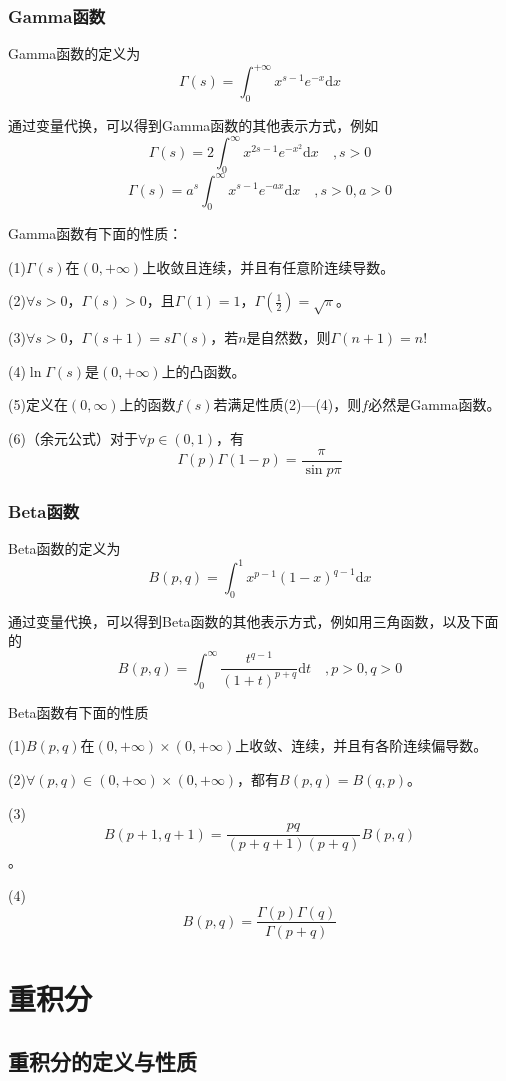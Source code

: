 \documentclass[UTF8,openany]{book}
\begin{document}
	\subsection{Gamma函数}
	\par Gamma函数的定义为
	\[
	\Gamma(s)=\int_{0}^{+\infty}x^{s-1}e^{-x}\mathrm{d}x	
	\]
	\par 通过变量代换，可以得到Gamma函数的其他表示方式，例如
	\[
	\Gamma(s)=2\int_{0}^{\infty}x^{2s-1}e^{-x^2}\mathrm{d}x\quad,s>0	
	\]
	\[
	\Gamma(s)=a^s\int_{0}^{\infty}x^{s-1}e^{-ax}\mathrm{d}x\quad,s>0,a>0	
	\]
	\par Gamma函数有下面的性质：
	\par (1)$\Gamma(s)$在$(0,+\infty)$上收敛且连续，并且有任意阶连续导数。
	\par (2)$\forall s>0$，$\Gamma(s)>0$，且$\Gamma(1)=1$，$\Gamma(\frac{1}{2})=\sqrt{\pi}$。
	\par (3)$\forall s>0$，$\Gamma(s+1)=s\Gamma(s)$，若$n$是自然数，则$\Gamma(n+1)=n!$
	\par (4)$\ln\Gamma(s)$是$(0,+\infty)$上的凸函数。
	\par (5)定义在$(0,\infty)$上的函数$f(s)$若满足性质(2)—(4)，则$f$必然是Gamma函数。
	\par (6)（余元公式）对于$\forall p\in(0,1)$，有
	$$\Gamma(p)\Gamma(1-p)=\frac{\pi}{\sin p\pi}$$
	\subsection{Beta函数}
	\par Beta函数的定义为
	\[
	B(p,q)=\int_{0}^{1}x^{p-1}(1-x)^{q-1}\mathrm{d}x	
	\]
	\par 通过变量代换，可以得到Beta函数的其他表示方式，例如用三角函数，以及下面的
	\[
	B(p,q)=\int_{0}^{\infty}\frac{t^{q-1}}{(1+t)^{p+q}}\mathrm{d}t\quad,p>0,q>0
	\]
	\par Beta函数有下面的性质
	\par (1)$B(p,q)$在$(0,+\infty)\times(0,+\infty)$上收敛、连续，并且有各阶连续偏导数。
	\par (2)$\forall(p,q)\in(0,+\infty)\times(0,+\infty)$，都有$B(p,q)=B(q,p)$。
	\par (3)$$B(p+1,q+1)=\frac{pq}{(p+q+1)(p+q)}B(p,q)$$。
	\par (4)$$B(p,q)=\frac{\Gamma(p)\Gamma(q)}{\Gamma(p+q)}$$

	\chapter{重积分}
	\section{重积分的定义与性质}
\end{document}
